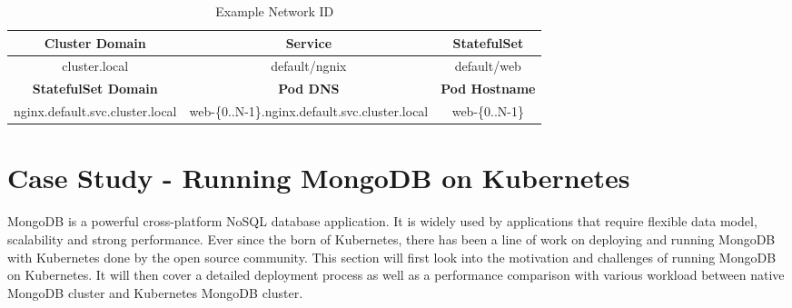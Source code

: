 \documentclass[sigconf]{acmart}
\begin{document}
\begin{table*}[]
    \centering
    \begin{tabular}{|c|c|c|}
        \hline
        \textbf{Cluster Domain} & \textbf{Service} & \textbf{StatefulSet} \\
        \hline
        cluster.local & default/ngnix & default/web \\
        \hline
        \textbf{StatefulSet Domain} & \textbf{Pod DNS} & \textbf{Pod Hostname} \\
        \hline
        nginx.default.svc.cluster.local & web-\{0..N-1\}.nginx.default.svc.cluster.local & web-\{0..N-1\} \\ 
        \hline
    \end{tabular}
    \caption{Example Network ID}
    \label{tab:Stateful Network}
\end{table*}

\section{Case Study - Running MongoDB on Kubernetes}
MongoDB is a powerful cross-platform NoSQL database application. It is widely used by applications that require flexible data model, scalability and strong performance. Ever since the born of Kubernetes, there has been a line of work on deploying and running MongoDB with Kubernetes done by the open source community. This section will first look into the motivation and challenges of running MongoDB on Kubernetes. It will then cover a detailed deployment process as well as a performance comparison with various workload between native MongoDB cluster and Kubernetes MongoDB cluster.
\end{document}
